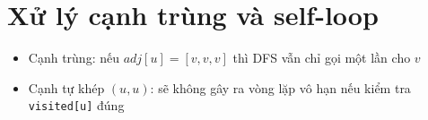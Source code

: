 \documentclass[12pt]{article}
\begin{document}
\section*{Xử lý cạnh trùng và self-loop}
\begin{itemize}
    \item Cạnh trùng: nếu $adj[u] = [v, v, v]$ thì DFS vẫn chỉ gọi một lần cho $v$
    \item Cạnh tự khép $(u, u)$: sẽ không gây ra vòng lặp vô hạn nếu kiểm tra \texttt{visited[u]} đúng
\end{itemize}
\end{document}
